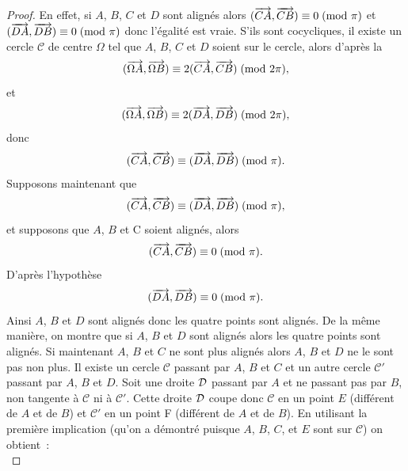 \begin{proof}
    En effet, si \(A\), \(B\), \(C\) et \(D\) sont alignés alors 
    \((\overrightarrow{CA},\overrightarrow{CB}) \equiv 0\!\pmod {\pi}\) et 
    \((\overrightarrow{DA},\overrightarrow{DB}) \equiv 0\!\pmod {\pi}\) donc l'égalité est vraie. S'ils 
    sont cocycliques, il existe un cercle \(\mathcal{C}\) de centre \(\Omega\) 
    tel que \(A\), \(B\), \(C\) et \(D\) soient sur le cercle, alors d'après la 
    \begin{equation}
        (\overrightarrow{\Omega A}, \overrightarrow{\Omega 
        B}) \equiv 2(\overrightarrow{CA},\overrightarrow{CB})\!\pmod {2\pi},
    \end{equation}
    et \begin{equation}
        (\overrightarrow{\Omega A}, \overrightarrow{\Omega 
        B}) \equiv 2(\overrightarrow{DA},\overrightarrow{DB})\!\pmod {2\pi},
    \end{equation}
    donc \begin{equation}
        (\overrightarrow{CA},\overrightarrow{CB}) \equiv (\overrightarrow{DA},\overrightarrow{DB})\!\pmod {\pi}.
    \end{equation}
    Supposons maintenant que \begin{equation}
        (\overrightarrow{CA},\overrightarrow{CB}) \equiv (\overrightarrow{DA},\overrightarrow{DB})\!\pmod {\pi},
    \end{equation}
    et supposons que \(A\), \(B\) et C soient alignés, alors \begin{equation}
        (\overrightarrow{CA},\overrightarrow{CB}) \equiv 0\!\pmod {\pi}.
    \end{equation}
    D'après l'hypothèse
    \begin{equation}
        (\overrightarrow{DA},\overrightarrow{DB}) \equiv 0\!\pmod {\pi}.
    \end{equation}
    Ainsi \(A\), \(B\) et \(D\) sont alignés donc les quatre points sont 
    alignés. De la même manière, on montre que si \(A\), \(B\) et \(D\) sont 
    alignés alors les quatre points sont alignés. Si maintenant \(A\), \(B\) et 
    \(C\) ne sont plus alignés alors \(A\), \(B\) et \(D\) ne le sont pas non 
    plus. Il existe un cercle \(\mathcal{C}\) passant par \(A\), \(B\) et \(C\) 
    et un autre cercle \(\mathcal{C}'\) passant par \(A\), \(B\) et \(D\). Soit 
    une droite \(\mathcal{D}\) passant par \(A\) et ne passant pas par \(B\), non 
    tangente à \(\mathcal{C}\) ni à \(\mathcal{C}'\). Cette droite \(\mathcal{D}\) coupe 
    donc \(\mathcal{C}\) en un point \(E\) (différent de \(A\) et de \(B\)) et 
    \(\mathcal{C}'\) en un point F (différent de \(A\) et de \(B\)). En 
    utilisant la première implication (qu'on a démontré puisque \(A\), \(B\), 
    \(C\), et \(E\) sont sur \(\mathcal{C}\)) on obtient~:
    \begin{equation}

\end{equation}
\end{proof}
